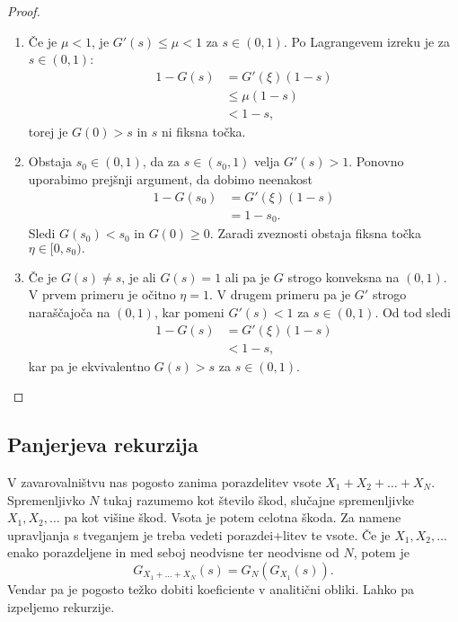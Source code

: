 \documentclass[10pt, a4paper]{article}
\newenvironment{noticeC}{%
  \tcolorbox[%
  notitle,
  empty,
  enhanced,  %
  breakable,
  coltext=black, 
  fontupper=\rmfamily,
  parbox=false,
  noparskip,
  sharp corners,
  boxrule=-1pt,  %
  frame hidden,
  left=7pt,  %
  right=7pt,
  top=5pt,
  bottom=5pt,
  before skip=2.5ex plus 2pt,
  after skip=2.5ex plus 2pt,
  overlay unbroken and last={%
  },
  ]}
{\endtcolorbox}
\newenvironment{dokaz}%
  {\begin{noticeC}\begin{proof}}%
  {\end{proof}\end{noticeC}}
\begin{document}
\begin{dokaz}
  \begin{enumerate}
    \item Če je $\mu < 1$, je $G'(s) \leq \mu < 1$ za $s \in (0, 1)$.
    Po Lagrangevem izreku je za $s \in (0, 1)$:
    \begin{align*}
      1 - G(s) &= G'(\xi) (1 - s)\\
      &\leq \mu (1 - s)\\
      &< 1 - s,
    \end{align*}
    torej je $G(0) > s$ in $s$ ni fiksna točka.
    \item Obstaja $s_0 \in (0, 1)$, da za $s \in (s_0, 1)$ velja $G'(s) > 1$.
    Ponovno uporabimo prejšnji argument, da dobimo neenakost 
    \begin{align*}
      1 - G(s_0) &= G'(\xi) (1 - s)\\
      &= 1 - s_0.
    \end{align*}
    Sledi $G(s_0) < s_0$ in $G(0) \geq 0$.
    Zaradi zveznosti obstaja fiksna točka $\eta \in [0, s_0).$
    \item Če je $G(s) \neq s$, je ali $G(s) = 1$ ali pa je $G$ strogo konveksna na 
    $(0, 1)$. V prvem primeru je očitno $\eta = 1$. V drugem primeru pa je $G'$ strogo naraščajoča
    na $(0, 1)$, kar pomeni $G'(s) < 1$ za $s \in (0, 1)$.
    Od tod sledi 
    \begin{align*}
      1 - G(s) &= G'(\xi) (1 - s)\\
      &< 1 - s,
    \end{align*}
    kar pa je ekvivalentno $G(s) > s$ za $s \in (0, 1)$. \qedhere
  \end{enumerate}
\end{dokaz}

\subsection{Panjerjeva rekurzija}

V zavarovalništvu nas pogosto zanima porazdelitev vsote $X_1 + X_2 + \dots + X_N$.
Spremenljivko $N$ tukaj razumemo kot število škod, slučajne spremenljivke $X_1, X_2, \dots$
pa kot višine škod. Vsota je potem celotna škoda.
Za namene upravljanja s tveganjem je treba vedeti porazdei+litev te vsote.
Če je $X_1, X_2, \dots$ enako porazdeljene in med seboj neodvisne ter neodvisne od $N$,
potem je $$G_{X_1 + \dots + X_N} (s) = G_N (G_{X_1} (s)).$$
Vendar pa je pogosto težko dobiti koeficiente v analitični obliki.
Lahko pa izpeljemo rekurzije.
\end{document}
